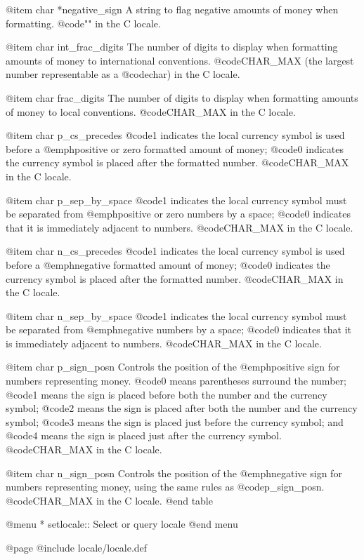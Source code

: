 @item char *negative_sign
A string to flag negative amounts of money when formatting.
@code{""} in the C locale.

@item char int_frac_digits
The number of digits to display when formatting amounts of money to
international conventions.
@code{CHAR_MAX} (the largest number representable as a @code{char}) in
the C locale.

@item char frac_digits
The number of digits to display when formatting amounts of money to
local conventions.
@code{CHAR_MAX} in the C locale.

@item char p_cs_precedes
@code{1} indicates the local currency symbol is used before a
@emph{positive or zero} formatted amount of money; @code{0} indicates
the currency symbol is placed after the formatted number.
@code{CHAR_MAX} in the C locale.

@item char p_sep_by_space
@code{1} indicates the local currency symbol must be separated from
@emph{positive or zero} numbers by a space; @code{0} indicates that it
is immediately adjacent to numbers.
@code{CHAR_MAX} in the C locale.

@item char n_cs_precedes
@code{1} indicates the local currency symbol is used before a
@emph{negative} formatted amount of money; @code{0} indicates
the currency symbol is placed after the formatted number.
@code{CHAR_MAX} in the C locale.

@item char n_sep_by_space
@code{1} indicates the local currency symbol must be separated from
@emph{negative} numbers by a space; @code{0} indicates that it
is immediately adjacent to numbers.
@code{CHAR_MAX} in the C locale.

@item char p_sign_posn
Controls the position of the @emph{positive} sign for
numbers representing money.  @code{0} means parentheses surround the
number; @code{1} means the sign is placed before both the number and the
currency symbol; @code{2} means the sign is placed after both the number
and the currency symbol; @code{3} means the sign is placed just before
the currency symbol; and @code{4} means the sign is placed just after
the currency symbol.
@code{CHAR_MAX} in the C locale.

@item char n_sign_posn
Controls the position of the @emph{negative} sign for numbers
representing money, using the same rules as @code{p_sign_posn}.
@code{CHAR_MAX} in the C locale.
@end table

@menu
* setlocale::  Select or query locale
@end menu

@page
@include locale/locale.def
